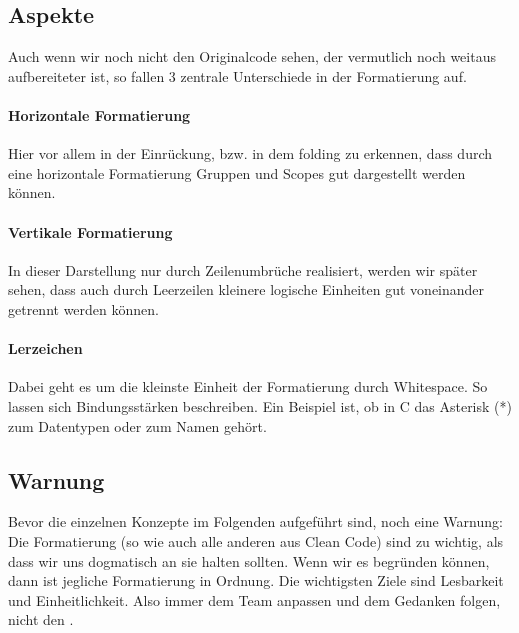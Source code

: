 	\subsection{Aspekte}
		Auch wenn wir noch nicht den Originalcode sehen, der vermutlich noch weitaus aufbereiteter ist, so fallen 3 zentrale Unterschiede in der Formatierung auf.
		\paragraph{Horizontale Formatierung}
			Hier vor allem in der Einrückung, bzw. in dem folding zu erkennen, dass durch eine horizontale Formatierung Gruppen und Scopes gut dargestellt werden können.
		\paragraph{Vertikale Formatierung}
			In dieser Darstellung nur durch Zeilenumbrüche realisiert, werden wir später sehen, dass auch durch Leerzeilen kleinere logische Einheiten gut voneinander getrennt werden können.
		\paragraph{Lerzeichen}
			Dabei geht es um die kleinste Einheit der Formatierung durch Whitespace.
			So lassen sich Bindungsstärken beschreiben.
			Ein Beispiel ist, ob in C das Asterisk (*) zum Datentypen oder zum Namen gehört.

	\subsection{Warnung}
		Bevor die einzelnen Konzepte im Folgenden aufgeführt sind, noch eine Warnung:\\
		Die Formatierung (so wie auch alle anderen  aus Clean Code) sind zu wichtig, als dass wir uns dogmatisch an sie halten sollten.
		Wenn wir es begründen können, dann ist jegliche Formatierung in Ordnung.
		Die wichtigsten Ziele sind Lesbarkeit und Einheitlichkeit.
		Also immer dem Team anpassen und dem Gedanken folgen, nicht den .
